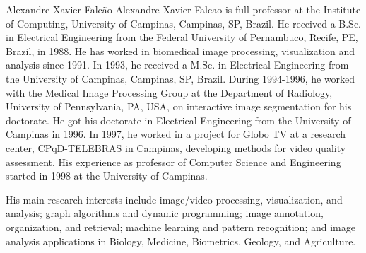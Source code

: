 \documentclass[journal]{IEEEtran}
\begin{document}
\begin{IEEEbiography}{Alexandre Xavier Falcão} 
Alexandre Xavier Falcao is full professor at the Institute of Computing, University of Campinas, Campinas, SP, Brazil. 
He received a B.Sc. in Electrical Engineering from the Federal University of Pernambuco, Recife, PE, Brazil, in 1988. He has worked in biomedical image processing, visualization and analysis since 1991. 
In 1993, he received a M.Sc. in Electrical Engineering from the University of Campinas, Campinas, SP, Brazil. 
During 1994-1996, he worked with the Medical Image Processing Group at the Department of Radiology, University of Pennsylvania, PA, USA, on interactive image segmentation for his doctorate. 
He got his doctorate in Electrical Engineering from the University of Campinas in 1996. 
In 1997, he worked in a project for Globo TV at a research center, CPqD-TELEBRAS in Campinas, developing methods for video quality assessment. 
His experience as professor of Computer Science and Engineering started in 1998 at the University of Campinas. 

His main research interests include image/video processing, visualization, and analysis; graph algorithms and dynamic programming; image annotation, organization, and retrieval; machine learning and pattern recognition; and image analysis applications in Biology, Medicine, Biometrics, Geology, and Agriculture.
\end{IEEEbiography}
\end{document}
